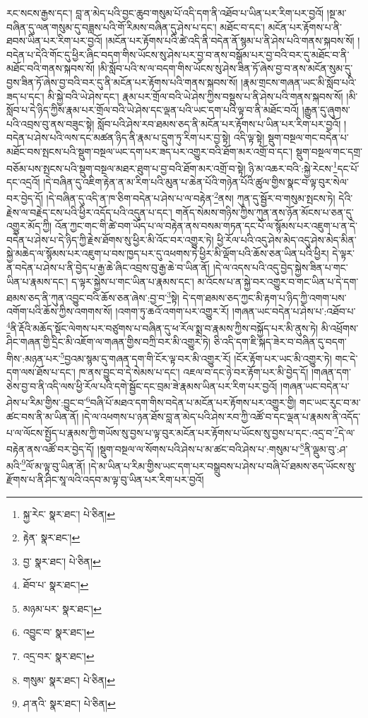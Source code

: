 རང་སངས་རྒྱས་དང་། བླ་ན་མེད་པའི་བྱང་ཆུབ་གསུམ་པོ་འདི་དག་ནི་འཐོབ་པ་ཡིན་པར་རིག་པར་བྱའོ། །སྔ་མ་བཞིན་དུ་ལན་གསུམ་དུ་བཟླས་པའི་གོ་རིམས་བཞིན་དུ་ཤེས་པ་དང་། མཐོང་བ་དང་། མངོན་པར་རྟོགས་པ་ནི་ཐབས་ཡིན་པར་རིག་པར་བྱའོ། །མངོན་པར་རྟོགས་པའི་ཚེ་འདི་ནི་བདེན་ནོ་སྙམ་པ་ནི་ཤེས་པའི་གནས་སྐབས་སོ། །བདེན་པ་དེའི་གོང་དུ་ཕྱིར་ཞིང་བདག་གིས་ཡོངས་སུ་ཤེས་པར་བྱ་བ་ནས་བསྒོམ་པར་བྱ་བའི་བར་དུ་མཐོང་བ་ནི་མཐོང་བའི་གནས་སྐབས་སོ། །མི་སློབ་པའི་ས་ལ་བདག་གིས་ཡོངས་སུ་ཤེས་ཟིན་ཏོ་ཞེས་བྱ་བ་ནས་མངོན་སུམ་དུ་བྱས་ཟིན་ཏོ་ཞེས་བྱ་བའི་བར་དུ་ནི་མངོན་པར་རྟོགས་པའི་གནས་སྐབས་སོ། །རྣམ་གྲངས་གཞན་ཡང་མི་སློབ་པའི་ཟད་པ་དང་། མི་སྐྱེ་བའི་ཡེ་ཤེས་དང་། རྣམ་པར་གྲོལ་བའི་ཡེ་ཤེས་ཀྱིས་བསྡུས་པ་ནི་ཤེས་པའི་གནས་སྐབས་སོ། །མི་སློབ་པ་དེ་ཉིད་ཀྱིས་རྣམ་པར་གྲོལ་བའི་ཡེ་ཤེས་དང་ལྡན་པའི་ཡང་དག་པའི་ལྟ་བ་ནི་མཐོང་བའོ། །རྒྱུན་དུ་ཞུགས་པའི་འབྲས་བུ་ནས་བཟུང་སྟེ། སློབ་པའི་ཤེས་རབ་ཐམས་ཅད་ནི་མངོན་པར་རྟོགས་པ་ཡིན་པར་རིག་པར་བྱའོ། །བདེན་པ་ཤེས་པའི་ལས་དང་མཚན་ཉིད་ནི་རྣམ་པ་དྲུག་ཏུ་རིག་པར་བྱ་སྟེ། འདི་ལྟ་སྟེ། སྡུག་བསྔལ་གང་བདེན་པ་མཐོང་བས་སྤངས་པའི་སྡུག་བསྔལ་ཡང་དག་པར་ཟད་པར་འགྱུར་བའི་ཐོག་མར་འགྲོ་བ་དང་། སྡུག་བསྔལ་གང་དགྲ་བཅོམ་པས་སྤངས་པའི་སྡུག་བསྔལ་མཐར་ཐུག་པ་བྱ་བའི་ཐོག་མར་འགྲོ་བ་སྟེ། ཉི་མ་འཆར་བའི་:སྐྱེ་རེངས་\footnote{སྐྱ་རེང་  སྣར་ཐང་།  པེ་ཅིན། }དང་པོ་དང་འདྲའོ། །དེ་བཞིན་དུ་འཇིག་རྟེན་ན་མ་རིག་པའི་མུན་པ་ཆེན་པོའི་གཉེན་པོའི་ཚུལ་གྱིས་སྣང་བ་ལྟ་བུར་སེལ་བར་བྱེད་དོ། །དེ་བཞིན་དུ་འདི་ན་ཁ་ཅིག་བདེན་པ་ཤེས་པ་ལ་བརྟེན་\footnote{རྟེན་  སྣར་ཐང་། }ནས། ཀུན་དུ་སྦྱོར་བ་གསུམ་སྤངས་ཏེ། དེའི་རྗེས་ལ་བརྗེད་ངས་པའི་ཕྱིར་འདོད་པའི་འདུན་པ་དང་། གནོད་སེམས་གཉིས་ཀྱིས་ཀུན་ནས་ཉོན་མོངས་པ་ཅན་དུ་འགྱུར་མོད་ཀྱི། འོན་ཀྱང་གང་གི་ཚེ་བག་ཡོད་པ་ལ་བརྟེན་ནས་བསམ་གཏན་དང་པོ་ལ་སྙོམས་པར་འཇུག་པ་ན་དེ་བདེན་པ་ཤེས་པ་དེ་ཉིད་ཀྱི་རྗེས་ཐོགས་སུ་ཕྱིར་མི་འོང་བར་འགྱུར་ཏེ། ཕྱི་རོལ་པའི་འདུ་ཤེས་མེད་འདུ་ཤེས་མེད་མིན་སྐྱེ་མཆེད་ལ་སྙོམས་པར་འཇུག་པ་བས་ཁྱད་པར་དུ་འཕགས་ཏེ་ཕྱིར་མི་ལྡོག་པའི་ཆོས་ཅན་ཡིན་པའི་ཕྱིར། དེ་ལྟར་ན་བདེན་པ་ཤེས་པ་ནི་བྱེད་པ་རྒྱ་ཆེ་ཞིང་འབྲས་བུ་རྒྱ་ཆེ་བ་ཡིན་ནོ། །དེ་ལ་འདས་པའི་འདུ་བྱེད་སྐྱེས་ཟིན་པ་གང་ཡིན་པ་རྣམས་དང་། ད་ལྟར་སྐྱེས་པ་གང་ཡིན་པ་རྣམས་དང་། མ་འོངས་པ་ན་སྐྱེ་བར་འགྱུར་བ་གང་ཡིན་པ་དེ་དག་ཐམས་ཅད་ནི་ཀུན་འབྱུང་བའི་ཆོས་ཅན་ཞེས་:བྱ་བ་\footnote{བྱ་  སྣར་ཐང་།  པེ་ཅིན། }སྟེ། དེ་དག་ཐམས་ཅད་ཀྱང་མི་རྟག་པ་ཉིད་ཀྱི་འགག་པས་འགོག་པའི་ཆོས་ཀྱིས་འགགས་སོ། །འགག་ཏུ་ཆའོ་འགག་པར་འགྱུར་རོ། །གཞན་ཡང་བདེན་པ་ཤེས་པ་:འཐོབ་པ་\footnote{ཐོབ་པ་  སྣར་ཐང་། }ནི་རྡོའི་མཆོད་སྡོང་ལེགས་པར་བཙུགས་པ་བཞིན་དུ་ཕ་རོལ་སྨྲ་བ་རྣམས་ཀྱིས་བསྐྱོད་པར་མི་ནུས་ཏེ། མི་འཕྲོགས་ཤིང་གཞན་གྱི་དྲིང་མི་འཇོག་ལ་གཞན་གྱིས་བཀྲི་བར་མི་འགྱུར་ཏེ། ཅི་འདི་དག་ཇི་སྐད་ཟེར་བ་བཞིན་དུ་བདག་གིས་:མཉན་པར་\footnote{མཉམ་པར་  སྣར་ཐང་། }བྱའམ་སྙམ་དུ་གཞན་དག་གི་ངོར་ལྟ་བར་མི་འགྱུར་རོ། །ངོར་རྟོག་པར་ཡང་མི་འགྱུར་ཏེ། གང་དེ་དག་ལས་ཐོས་པ་དང་། ཁ་ནས་བྱུང་བ་དེ་སེམས་པ་དང་། འཇལ་བ་དང་ཉེ་བར་རྟོག་པར་མི་བྱེད་དོ། །གཞན་དག་ཅེས་བྱ་བ་ནི་འདི་ལས་ཕྱི་རོལ་པའི་དགེ་སྦྱོང་དང་བྲམ་ཟེ་རྣམས་ཡིན་པར་རིག་པར་བྱའོ། །གཞན་ཡང་བདེན་པ་ཤེས་པ་རིམ་གྱིས་:བྱུང་བ་\footnote{འབྱུང་བ་  སྣར་ཐང་། }བཞི་པོ་མཐའ་དག་གིས་བདེན་པ་མངོན་པར་རྟོགས་པར་འགྱུར་གྱི། གང་ཡང་རུང་བ་མ་ཚང་བས་ནི་མ་ཡིན་ནོ། །དེ་ལ་འཕགས་པ་ཉན་ཐོས་བླ་ན་མེད་པའི་ཤེས་རབ་ཀྱི་འཚོ་བ་དང་ལྡན་པ་རྣམས་ནི་འདོད་པ་ལ་ལོངས་སྤྱོད་པ་རྣམས་ཀྱི་གཡོས་སུ་བྱས་པ་ལྟ་བུར་མངོན་པར་རྟོགས་པ་ཡོངས་སུ་བྱས་པ་དང་:འདྲ་བ་\footnote{འདྲ་བར་  སྣར་ཐང་། }དེ་ལ་བརྟེན་ནས་འཚོ་བར་བྱེད་དོ། །སྡུག་བསྔལ་ལ་སོགས་པའི་ཤེས་པ་མ་ཚང་བའི་ཤེས་པ་:གསུམ་པ་\footnote{གསུམ་  སྣར་ཐང་།  པེ་ཅིན། }ནི་ལྡུམ་བུ་:ཤ་མའི་\footnote{ཤ་ནའི་  སྣར་ཐང་།  པེ་ཅིན། }ལོ་མ་ལྟ་བུ་ཡིན་ནོ། །དེ་མ་ཡིན་པ་རིམ་གྱིས་ཡང་དག་པར་བསྒྲུབས་པ་ཤེས་པ་བཞི་པོ་ཐམས་ཅད་ཡོངས་སུ་རྫོགས་པ་ནི་ཤིང་སཱ་ལའི་འདབ་མ་ལྟ་བུ་ཡིན་པར་རིག་པར་བྱའོ། 